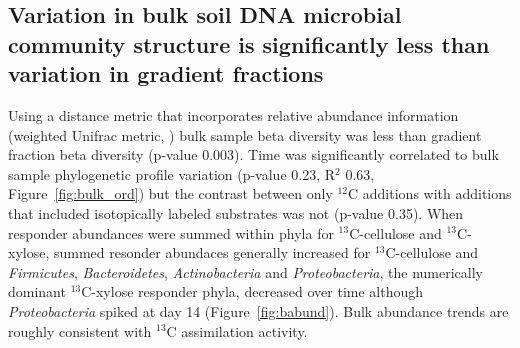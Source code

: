 \subsection{Variation in bulk soil DNA microbial community structure is
significantly less than variation in gradient fractions} 
Using a distance metric that incorporates relative abundance information
(weighted Unifrac metric, \citep{Lozupone_2005}) bulk sample beta diversity was
less than gradient fraction beta diversity (p-value 0.003). Time was
significantly correlated to bulk sample phylogenetic profile variation (p-value
0.23, R$^{2}$ 0.63, Figure~\ref{fig:bulk_ord}) but the contrast between only
$^{12}$C additions with additions that included isotopically labeled substrates
was not (p-value 0.35). When responder abundances were summed within phyla for
$^{13}$C-cellulose and $^{13}$C-xylose, summed resonder abundaces generally 
increased for $^{13}$C-cellulose and \textit{Firmicutes}, \textit{Bacteroidetes},
\textit{Actinobacteria} and \textit{Proteobacteria}, the numerically dominant
$^{13}$C-xylose responder phyla, decreased over time although 
\textit{Proteobacteria} spiked at day 14 (Figure~\ref{fig:babund}). Bulk abundance trends are
roughly consistent with $^{13}$C assimilation activity. 
